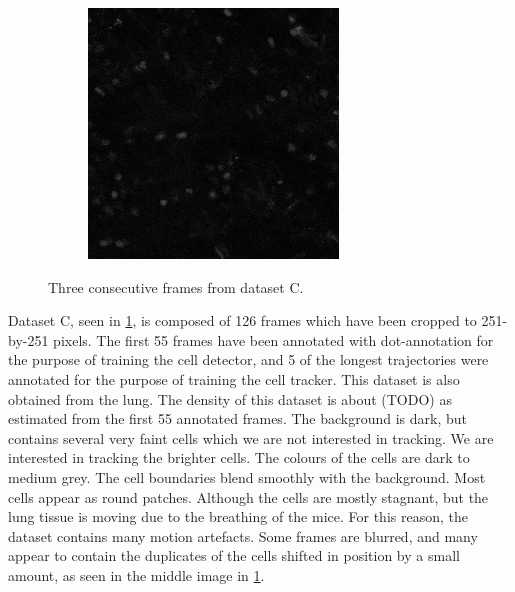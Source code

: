 \begin{figure}[h]
\begin{subfigure}{.32\textwidth}
    	\end{subfigure}
   		\hfill
  	    \begin{subfigure}{.32\textwidth}
   	  		\includegraphics[width=\textwidth]{images/series13greencropped010}
  	    \end{subfigure}
    	\caption{Three consecutive frames from dataset C.}
    	\label{fig:data_datasetC}
    \end{figure}
        
    Dataset C, seen in \cref{fig:data_datasetC}, is composed of 126 frames which have been cropped to 251-by-251 pixels. The first 55 frames have been annotated with dot-annotation for the purpose of training the cell detector, and 5 of the longest trajectories were annotated for the purpose of training the cell tracker. This dataset is also obtained from the lung. The density of this dataset is about (TODO) as estimated from the first 55 annotated frames. The background is dark, but contains several very faint cells which we are not interested in tracking. We are interested in tracking the brighter cells. The colours of the cells are dark to medium grey. The cell boundaries blend smoothly with the background. Most cells appear as round patches. Although the cells are mostly stagnant, but the lung tissue is moving due to the breathing of the mice. For this reason, the dataset contains many motion artefacts. Some frames are blurred, and many appear to contain the duplicates of the cells shifted in position by a small amount, as seen in the middle image in \cref{fig:data_datasetC}.

